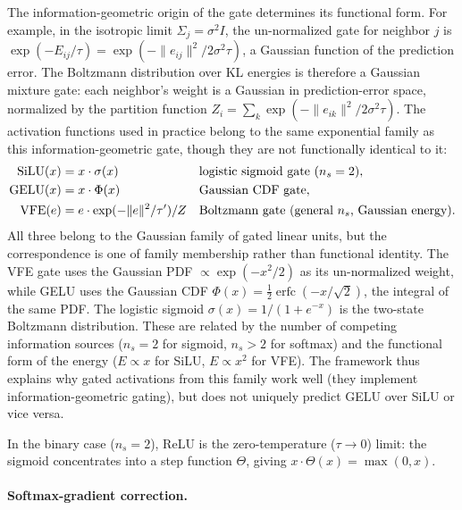 \documentclass[twoside,11pt]{article}
\begin{document}
The information-geometric origin of the gate determines its functional form. For example, in the isotropic limit $\Sigma_j = \sigma^2 I$, the un-normalized gate for neighbor $j$ is $\exp(-E_{ij}/\tau) = \exp(-\|e_{ij}\|^2 / 2\sigma^2\tau)$, a Gaussian function of the prediction error. The Boltzmann distribution over KL energies is therefore a Gaussian mixture gate: each neighbor's weight is a Gaussian in prediction-error space, normalized by the partition function $Z_i = \sum_k \exp(-\|e_{ik}\|^2/2\sigma^2\tau)$. The activation functions used in practice belong to the same exponential family as this information-geometric gate, though they are not functionally identical to it:
%
\begin{align}
\text{SiLU}(x) &= x \cdot \sigma(x) && \text{logistic sigmoid gate ($n_s = 2$)}, \notag \\
\text{GELU}(x) &= x \cdot \Phi(x) && \text{Gaussian CDF gate}, \label{eq:activation_comparison} \\
\text{VFE}(e) &= e \cdot \exp(-\|e\|^2/\tau')/Z && \text{Boltzmann gate (general $n_s$, Gaussian energy)}. \notag
\end{align}
%
All three belong to the Gaussian family of gated linear units, but the correspondence is one of family membership rather than functional identity. The VFE gate uses the Gaussian PDF $\propto \exp(-x^2/2)$ as its un-normalized weight, while GELU uses the Gaussian CDF $\Phi(x) = \frac{1}{2}\operatorname{erfc}(-x/\sqrt{2})$, the integral of the same PDF. The logistic sigmoid $\sigma(x) = 1/(1+e^{-x})$ is the two-state Boltzmann distribution. These are related by the number of competing information sources ($n_s = 2$ for sigmoid, $n_s > 2$ for softmax) and the functional form of the energy ($E \propto x$ for SiLU, $E \propto x^2$ for VFE). The framework thus explains why gated activations from this family work well (they implement information-geometric gating), but does not uniquely predict GELU over SiLU or vice versa.

In the binary case ($n_s = 2$), ReLU is the zero-temperature ($\tau \to 0$) limit: the sigmoid concentrates into a step function $\Theta$, giving $x \cdot \Theta(x) = \max(0, x)$.

\paragraph{Softmax-gradient correction.}
\end{document}
